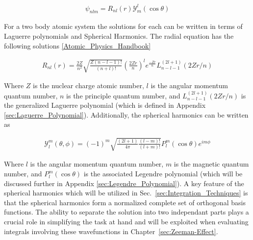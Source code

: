         \begin{align}
            \psi_{nlm} = R_{nl}(r) \mathcal{Y}^l_m (\cos \theta)
        \end{align}

        \noindent For a two body atomic system the solutions for each can be written in terms of Laguerre polynomials and Spherical Harmonics. The radial equation has the following solutions \ref{Atomic_Physics_Handbook}

        \begin{align}
            R_{nl}(r) = \frac{2Z}{n^2} \sqrt{\frac{Z(n - l - 1)!}{(n + l)!}} \left( \frac{2Zr}{n} \right)^l e^{\frac{-Zr}{n}} L_{n - l - 1}^{(2l + 1)} \left( 2Zr/n \right) \label{eq:radial_equation}
        \end{align}

        Where $Z$ is the nuclear charge atomic number, $l$ is the angular momentum quantum number, $n$ is the principle quantum number, and $L_{n - l - 1}^{(2l + 1)} (2Zr/n)$ is the generalized Laguerre polynomial (which is defined in Appendix \ref{sec:Laguerre_Polynomial}). Additionally, the spherical harmonics can be written as

        \begin{align}
            \mathcal{Y}^m_l (\theta, \phi) = (-1)^m \sqrt{\frac{(2l + 1)}{4 \pi}\frac{(l - m)!}{(l + m)!}} P_l^m (\cos \theta) e^{i m \phi} \label{eq:angular_equation}
        \end{align}

        Where $l$ is the angular momentum quantum number, $m$ is the magnetic quantum number, and $P_l^m (\cos \theta)$ is the associated Legendre polynomial (which will be discussed further in Appendix \ref{sec:Legendre_Polynomial}). A key feature of the spherical harmonics which will be utilized in Sec.~\ref{sec:Integration_Techniques} is that the spherical harmonics form a normalized complete set of orthogonal basis functions. The ability to separate the solution into two independant parts plays a crucial role in simplifying the task at hand and will be exploited when evaluating integrals involving these wavefunctions in Chapter~\ref{sec:Zeeman-Effect}.

